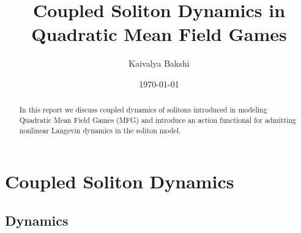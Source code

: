 \documentclass[letterpaper, 12pt]{article}
\begin{document}
	
	\title{\Large Coupled Soliton Dynamics in Quadratic Mean Field Games
	}
	\author{Kaivalya Bakshi}
	
	\date{\today}
	
	\maketitle
	
	
	
\begin{abstract}
	In this report we discuss coupled dynamics of solitons introduced in \cite{Ullmo2017} modeling Quadratic Mean Field Games (MFG) and introduce an action functional for admitting nonlinear Langevin dynamics in the soliton model.
\end{abstract}



\section{Coupled Soliton Dynamics}
\label{sec:1}


\subsection{Dynamics}
\end{document}
